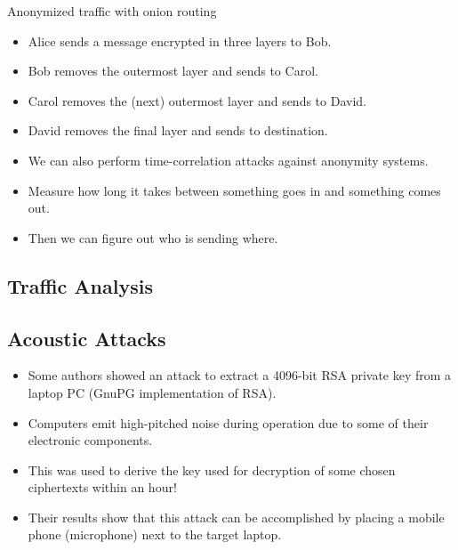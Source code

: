 \begin{frame}
  \begin{block}{Anonymized traffic with onion routing}
    \begin{itemize}
      \item Alice sends a message encrypted in three layers to Bob.
      \item Bob removes the outermost layer and sends to Carol.
      \item Carol removes the (next) outermost layer and sends to David.
      \item David removes the final layer and sends to destination.
    \end{itemize}
  \end{block}

  \pause{}

  \begin{example}
    \begin{itemize}
      \item We can also perform time-correlation attacks against anonymity 
        systems.

      \item Measure how long it takes between something goes in and something 
        comes out.

      \item Then we can figure out who is sending where.
    \end{itemize}
  \end{example}
\end{frame}

\subsection{Traffic Analysis}

\begin{frame}
\end{frame}

\subsection{Acoustic Attacks}

\begin{frame}
  \begin{itemize}
    \item Some authors showed an attack to extract 
      a 4096-bit RSA private key from a laptop PC (GnuPG implementation of 
      RSA).

    \item Computers emit high-pitched noise during operation due to some of 
      their electronic components.

    \item This was used to derive the key used for decryption of some chosen 
      ciphertexts within an hour!

    \item Their results show that this attack can be accomplished by placing 
      a mobile phone (microphone) next to the target laptop.
  \end{itemize}
\end{frame}

